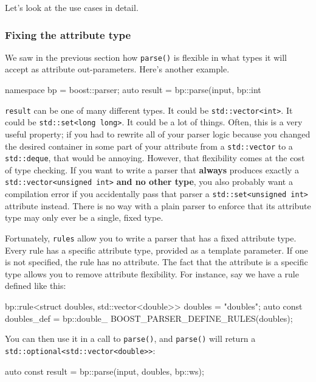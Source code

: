 Let's look at the use cases in detail.

\subsubsection{Fixing the attribute type}

We saw in the previous section how \texttt{parse()} is flexible in what types it will accept as attribute out-parameters. Here's another example.

\begin{code}
namespace bp = boost::parser;
auto result = bp::parse(input, bp::int %
\end{code}

\texttt{result} can be one of many different types. It could be \texttt{std::vector<int>}. It could be \texttt{std::set<long long>}. It could be a lot of things. Often, this is a very useful property; if you had to rewrite all of your parser logic because you changed the desired container in some part of your attribute from a \texttt{std::vector} to a \texttt{std::deque}, that would be annoying. However, that flexibility comes at the cost of type checking. If you want to write a parser that \textbf{always} produces exactly a \texttt{std::vector<unsigned int>} \textbf{and no other type}, you also probably want a compilation error if you accidentally pass that parser a \texttt{std::set<unsigned int>} attribute instead. There is no way with a plain parser to enforce that its attribute type may only ever be a single, fixed type.

Fortunately, \texttt{rules} allow you to write a parser that has a fixed attribute type. Every rule has a specific attribute type, provided as a template parameter. If one is not specified, the rule has no attribute. The fact that the attribute is a specific type allows you to remove attribute flexibility. For instance, say we have a rule defined like this:

\begin{code}
bp::rule<struct doubles, std::vector<double>> doubles = "doubles";
auto const doubles_def = bp::double_ %
BOOST_PARSER_DEFINE_RULES(doubles);
\end{code}

You can then use it in a call to \texttt{parse()}, and \texttt{parse()} will return a \texttt{std::optional<std::vector<double>>}:

\begin{code}
auto const result = bp::parse(input, doubles, bp::ws);
\end{code}

